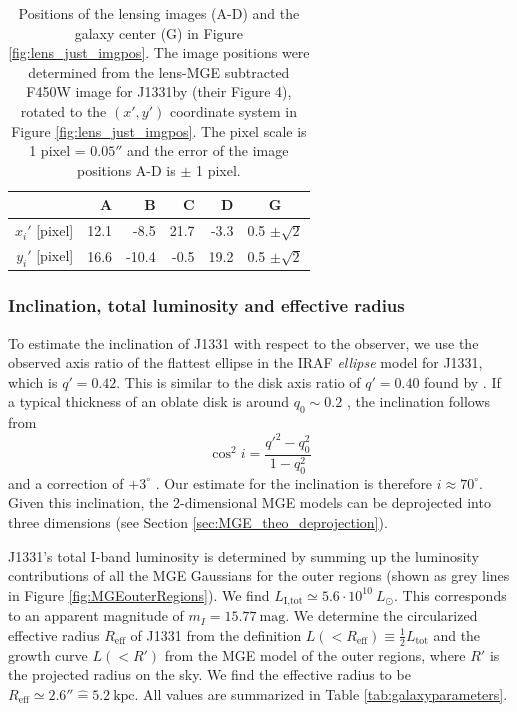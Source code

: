 \documentclass[useAMS,usenatbib]{mnras}
\begin{document}
\begin{table}
\centering
\caption{Positions of the lensing images (A-D) and the galaxy center (G) in Figure \ref{fig:lens_just_imgpos}. The image positions were determined from the lens-MGE subtracted F450W image for J1331by \citet{SWELLSIII} (their Figure 4), rotated to the $(x',y')$ coordinate system in Figure \ref{fig:lens_just_imgpos}. The pixel scale is 1 pixel = $0.05''$ and the error of the image positions A-D is $\pm$ 1 pixel.}
\begin{tabular}{r|rrrr|c}
\hline
  & A & B & C & D & G\\\hline
$x_i'$ [pixel] & 12.1 & -8.5 & 21.7 & -3.3 & 0.5 $\pm \sqrt{2}$ \\
$y_i'$ [pixel] & 16.6 & -10.4 & -0.5 & 19.2 & 0.5 $\pm \sqrt{2}$ \\
\hline
\end{tabular}
\label{tab:lenspos}
\end{table}

\subsubsection{Inclination, total luminosity and effective radius}

To estimate the inclination of J1331 with respect to the observer, we use the observed axis ratio of the flattest ellipse in the IRAF \emph{ellipse} model for J1331, which is $q'=0.42$. This is similar to the disk axis ratio of $q' = 0.40$ found by \citet{SWELLSI}. If a typical thickness of an oblate disk is around $q_0 \sim 0.2$ \citep{1958MeLu2.136....1H}, the inclination follows from 
\begin{equation*}
\cos^2 i = \frac{q'^2 - q_0^2}{1 - q_0^2}
\end{equation*}
and a correction of $+3^\circ$ \citep{1988ngc..book.....T}. Our estimate for the inclination is therefore $i \approx 70^\circ$. Given this inclination, the 2-dimensional MGE models can be deprojected into three dimensions (see Section \ref{sec:MGE_theo_deprojection}).

J1331's total I-band luminosity is determined by summing up the luminosity contributions of all the MGE Gaussians for the outer regions (shown as grey lines in Figure \ref{fig:MGEouterRegions}). We find $L_\text{I,tot} \simeq 5.6 \cdot 10^{10} ~L_\odot$. This corresponds to an apparent magnitude of $m_I = 15.77~\text{mag}$. We determine the circularized effective radius $R_\text{eff}$ of J1331 from the definition $L(<R_\text{eff}) \equiv \frac 12 L_\text{tot}$ and the growth curve $L(<R')$ from the MGE model of the outer regions, where $R'$ is the projected radius on the sky. We find the effective radius to be $R_\text{eff} \simeq 2.6'' \hat{=} 5.2~\text{kpc}$.  All values are summarized in Table \ref{tab:galaxyparameters}.
\end{document}
